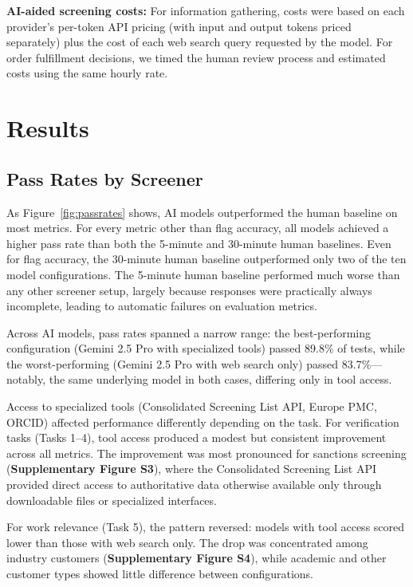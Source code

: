 \documentclass[utf8]{FrontiersinHarvard}
\begin{document}
\textbf{AI-aided screening costs:} For information gathering, costs were based on each provider's per-token API pricing (with input and output tokens priced separately) plus the cost of each web search query requested by the model. For order fulfillment decisions, we timed the human review process and estimated costs using the same hourly rate.

\section{Results}

\subsection{Pass Rates by Screener}

As Figure~\ref{fig:passrates} shows, AI models outperformed the human baseline on most metrics. For every metric other than flag accuracy, all models achieved a higher pass rate than both the 5-minute and 30-minute human baselines. Even for flag accuracy, the 30-minute human baseline outperformed only two of the ten model configurations. The 5-minute human baseline performed much worse than any other screener setup, largely because responses were practically always incomplete, leading to automatic failures on evaluation metrics.

Across AI models, pass rates spanned a narrow range: the best-performing configuration (Gemini 2.5 Pro with specialized tools) passed 89.8\% of tests, while the worst-performing (Gemini 2.5 Pro with web search only) passed 83.7\%---notably, the same underlying model in both cases, differing only in tool access.

Access to specialized tools (Consolidated Screening List API, Europe PMC, ORCID) affected performance differently depending on the task. For verification tasks (Tasks 1--4), tool access produced a modest but consistent improvement across all metrics. The improvement was most pronounced for sanctions screening (\textbf{Supplementary Figure S3}), where the Consolidated Screening List API provided direct access to authoritative data otherwise available only through downloadable files or specialized interfaces.

For work relevance (Task 5), the pattern reversed: models with tool access scored lower than those with web search only. The drop was concentrated among industry customers (\textbf{Supplementary Figure S4}), while academic and other customer types showed little difference between configurations.
\end{document}
